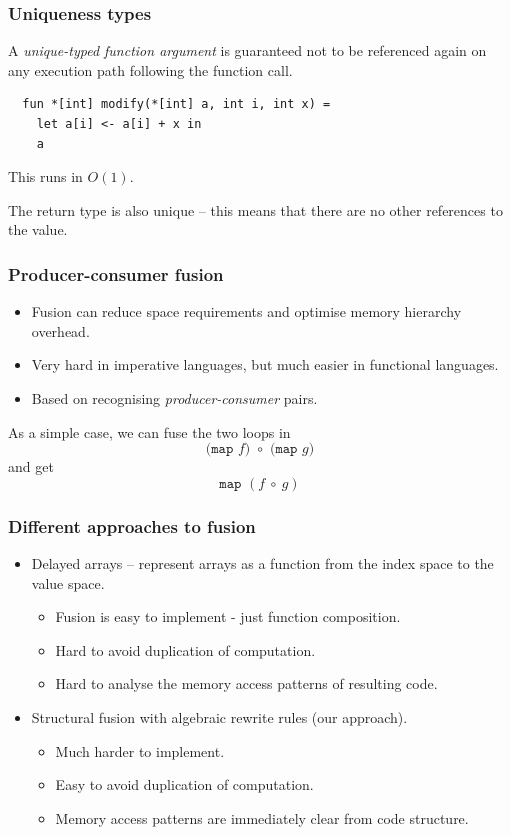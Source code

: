 \documentclass{beamer}
\begin{document}
\begin{frame}[fragile]
  \frametitle{Uniqueness types}

  A \textit{unique-typed function argument} is guaranteed not to be
  referenced again on any execution path following the function call.

  \begin{lstlisting}
  fun *[int] modify(*[int] a, int i, int x) =
    let a[i] <- a[i] + x in
    a
\end{lstlisting}

This runs in $O(1)$.

The return type is also unique -- this means that there are no other
references to the value.
\end{frame}

\begin{frame}
  \frametitle{Producer-consumer fusion}

  \begin{itemize}
  \item Fusion can reduce space requirements and optimise memory
    hierarchy overhead.
  \item Very hard in imperative languages, but much easier in
    functional languages.
  \item Based on recognising \textit{producer-consumer} pairs.
  \end{itemize}

As a simple case, we can fuse the two loops in
\[
\texttt{(map~$f$)~$\circ$~(map~$g$)}
\]
and get
\[
\texttt{map~$(f~\circ~g)$}
\]
\end{frame}

\begin{frame}
  \frametitle{Different approaches to fusion}

\begin{itemize}
\item Delayed arrays -- represent arrays as a function from the index
  space to the value space.
    \begin{itemize}
    \item Fusion is easy to implement - just function composition.
    \item Hard to avoid duplication of computation.
    \item Hard to analyse the memory access patterns of resulting code.
    \end{itemize}
\item Structural fusion with algebraic rewrite rules (our approach).
  \begin{itemize}
    \item Much harder to implement.
    \item Easy to avoid duplication of computation.
    \item Memory access patterns are immediately clear from code
      structure.
  \end{itemize}
\end{itemize}
\end{frame}
\end{document}
